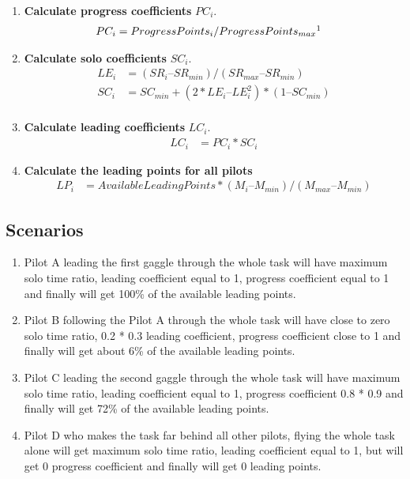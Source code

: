 \documentclass[gap.tex]{subfiles}
\begin{document}
\begin{enumerate}
    \item \textbf{Calculate progress coefficients} \(PC_i\).
        \begin{align*}
            PC_i &= ProgressPoints_i / ProgressPoints_{max}\footnotemark
        \end{align*}

    \item \textbf{Calculate solo coefficients} \(SC_i\).
        \begin{align*}
            LE_i &= (SR_i – SR_{min}) / (SR_{max} – SR_{min}) \\
            SC_i &= SC_{min} + (2*LE_i – LE_i^2) * (1 – SC_{min}) \\
        \end{align*}
            
    \item \textbf{Calculate leading coefficients} \(LC_i\).
        \begin{align*}
            LC_i &= PC_i * SC_i
        \end{align*}
            
    \item \textbf{Calculate the leading points for all pilots}
        \begin{align*}
            LP_i &= AvailableLeadingPoints * (M_i – M_{min}) / (M_{max} – M_{min} )
        \end{align*}
\end{enumerate}

\newpage
\subsection{Scenarios}

\begin{enumerate}
    \item Pilot A leading the first gaggle through the whole task will have
        maximum solo time ratio, leading coefficient equal to 1, progress
        coefficient equal to 1 and finally will get 100\% of the available
        leading points.

    \item Pilot B following the Pilot A through the whole task will have close
        to zero solo time ratio, 0.2 * 0.3 leading coefficient, progress
        coefficient close to 1 and finally will get about 6\% of the available
        leading points.

    \item Pilot C leading the second gaggle through the whole task will have
        maximum solo time ratio, leading coefficient equal to 1, progress
        coefficient 0.8 * 0.9 and finally will get 72\% of the available
        leading points.

    \item Pilot D who makes the task far behind all other pilots, flying the
        whole task alone will get maximum solo time ratio, leading coefficient
        equal to 1, but will get 0 progress coefficient and finally will get
        0 leading points.
\end{enumerate}
\end{document}
